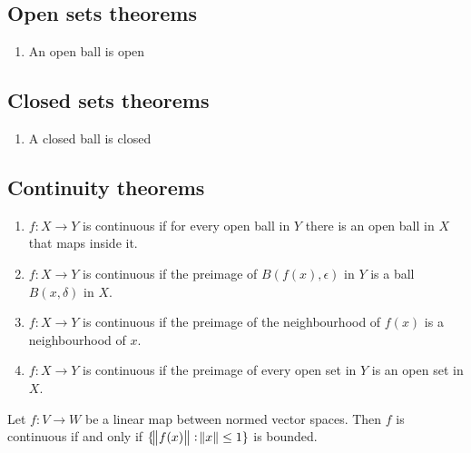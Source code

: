 \subsection{Open sets theorems}
\begin{enumerate}
\item An open ball is open
\end{enumerate}

\subsection{Closed sets theorems}
\begin{enumerate}
\item A closed ball is closed
\end{enumerate}


\subsection{Continuity theorems}
\begin{enumerate}
\item $f:X \to Y$ is continuous if for every open ball in $Y$ there is an open ball in $X$ that
  maps inside it.
\item $f:X \to Y$ is continuous if the preimage of $B(f(x), \epsilon)$ in $Y$ is a ball
  $B(x, \delta)$ in $X$.
\item $f:X \to Y$ is continuous if the preimage of the neighbourhood of $f(x)$ is a neighbourhood
  of $x$.
\item $f:X \to Y$ is continuous if the preimage of every open set in $Y$ is an open set in $X$.
\end{enumerate}



\begin{theorem}
  Let $f:V \to W$ be a linear map between normed vector spaces. Then $f$ is continuous if and only
  if $\{\norm{f(x)} : \norm{x} \leq 1\}$ is bounded.
\end{theorem}

